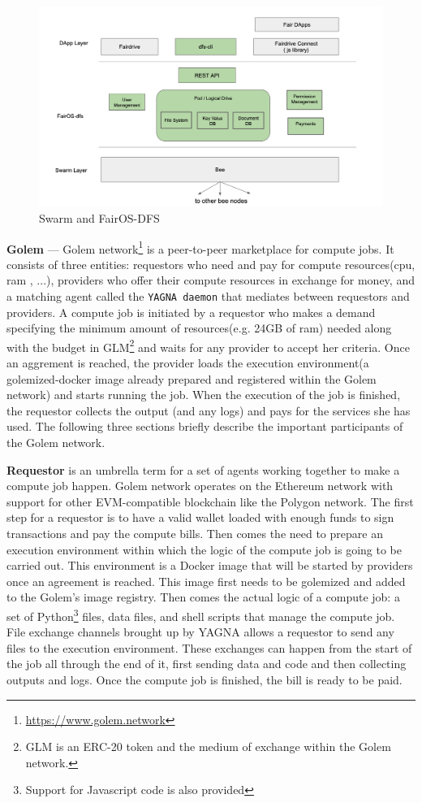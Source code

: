 \documentclass[a4paper, 10pt]{article}
\begin{document}
\begin{figure}
\includegraphics[scale=0.3,keepaspectratio=true]{images/swarm-fair.png}
\caption{\label{swarmfair}Swarm and \textcolor{fairgreen}{FairOS-DFS}}
\end{figure}
\par
\textbf{Golem} --- Golem network\footnote{\url{https://www.golem.network}} is a peer-to-peer marketplace for compute jobs. It consists of three entities: requestors who need and pay for compute resources(cpu, ram , ...), providers who offer their compute resources in exchange for money, and a matching agent called the \texttt{YAGNA daemon} that mediates between requestors and providers. A compute job is initiated by a requestor who makes a demand specifying the minimum amount of resources(e.g. 24GB of ram) needed along with the budget in GLM\footnote{GLM is an ERC-20 token and the medium of exchange within the Golem network.} and waits for any provider to accept her criteria. Once an aggrement is reached, the provider loads the execution environment(a golemized-docker image already prepared and registered within the Golem network) and starts running the job. When the execution of the job is finished, the requestor collects the output (and any logs) and pays for the services she has used. The following three sections briefly describe the important participants of the Golem network.
\par
\textbf{Requestor} is an umbrella term for a set of agents working together to make a compute job happen. Golem network operates on the Ethereum network with support for other EVM-compatible blockchain like the Polygon network. The first step for a requestor is to have a valid wallet loaded with enough funds to sign transactions and pay the compute bills. Then comes the need to prepare an execution environment within which the logic of the compute job is going to be carried out. This environment is a Docker image that will be started by providers once an agreement is reached. This image first needs to be golemized and added to the Golem's image registry. Then comes the actual logic of a compute job: a set of Python\footnote{Support for Javascript code is also provided} files, data files, and shell scripts that manage the compute job. File exchange channels brought up by YAGNA allows a requestor to send any files to the execution environment. These exchanges can happen from the start of the job all through the end of it, first sending data and code and then collecting outputs and logs. Once the compute job is finished, the bill is ready to be paid.
\end{document}
